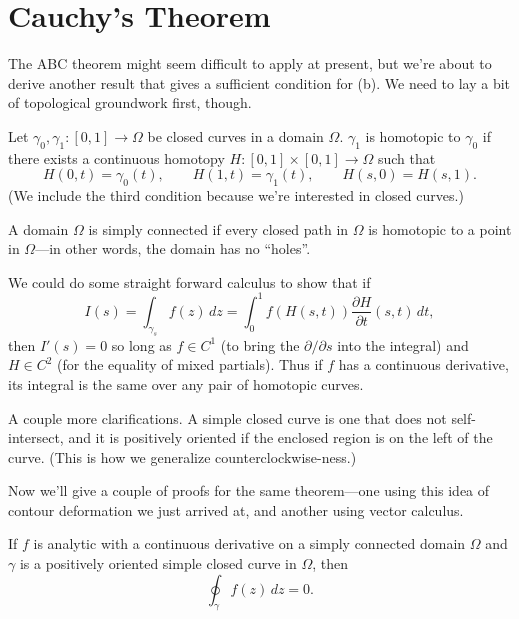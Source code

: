 \documentclass[../m136main.tex]{subfiles}
\begin{document}
\section{Cauchy's Theorem}
The ABC theorem might seem difficult to apply at present, but we're about to derive another result that gives a sufficient condition for (b).
We need to lay a bit of topological groundwork first, though.

\begin{definition}[Homotopy]
    Let $\gamma_0, \gamma_1 : [0,1] \to \Omega$ be closed curves in a domain $\Omega$.
    $\gamma_1$ is homotopic to $\gamma_0$ if there exists a continuous homotopy $H : [0,1] \times [0,1] \to \Omega$ such that
    \[ H(0,t) = \gamma_0(t), \qquad H(1,t) = \gamma_1(t), \qquad H(s,0) = H(s,1). \]
    (We include the third condition because we're interested in closed curves.)
\end{definition}

\begin{definition}
    A domain $\Omega$ is simply connected if every closed path in $\Omega$ is homotopic to a point in $\Omega$---in other words, the domain has no ``holes''.
\end{definition}

We could do some straight forward calculus to show that if
\[ I(s) = \int_{\gamma_s} f(z) \,dz = \int_0^1 f(H(s,t)) \frac{\partial H}{\partial t} (s,t) \,dt, \]
then $I'(s) = 0$ so long as $f \in C^1$ (to bring the $\partial / \partial s$ into the integral) and $H \in C^2$ (for the equality of mixed partials).
Thus if $f$ has a continuous derivative, its integral is the same over any pair of homotopic curves.

A couple more clarifications.
A simple closed curve is one that does not self-intersect, and it is positively oriented if the enclosed region is on the left of the curve.
(This is how we generalize counterclockwise-ness.)

\pagebreak

Now we'll give a couple of proofs for the same theorem---one using this idea of contour deformation we just arrived at, and another using vector calculus.

\begin{theorem}
    If $f$ is analytic with a continuous derivative on a simply connected domain $\Omega$ and $\gamma$ is a positively oriented simple closed curve in $\Omega$, then
    \[ \oint_\gamma f(z) \,dz = 0. \]
\end{theorem}
\end{document}
